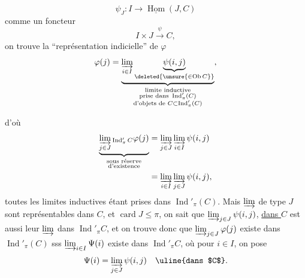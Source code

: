 \[
\psi_J:I\longrightarrow\underline{\operatorname{Hom}}(J,C)
\]
comme un foncteur
\[
I\times J\xrightarrow{\psi}C,
\]
on trouve la ``représentation indicielle'' de $\varphi$
\[
\varphi(j)=\underbrace{\varinjlim_{i\in I}\underbrace{\psi(i,j)}_{\deleted{\unsure{\in\operatorname{Ob}C}}}}_{\substack{\text{limite inductive}\\\text{prise dans }\operatorname{Ind}'_{\pi}(C)\\\text{d'objets de }C\subset\operatorname{Ind}'_{\pi}(C)}},
\]

d'où
\[
\begin{aligned}
\underbrace{\varinjlim_{j\in J}{}_{\operatorname{Ind}'_{\pi}C}\varphi(j)}_{\substack{\text{sous réserve}\\\text{d'existence}}}
&=\varinjlim_{j\in J}\varinjlim_{i\in I}\psi(i,j)\\
&=\varinjlim_{i\in I}\varinjlim_{j\in J}\psi(i,j),
\end{aligned}
\]
toutes les limites inductives étant prises dans $\operatorname{Ind}'_{\pi}(C)$. Mais   $\varinjlim$ de type $J$ sont représentables dans $C$, et $\operatorname{card}J\leq\pi$, on sait que  $\varinjlim_{j\in J}\psi(i,j)$, \uline{dans $C$} est aussi leur $\varinjlim$ dans $\operatorname{Ind}'_{\pi}C$, et on trouve donc que $\varinjlim_{j\in J}\varphi(j)$ existe dans $\operatorname{Ind}'_{\pi}(C)$ sss $\varinjlim_{i\in I}\Psi(i)$ existe dans $\operatorname{Ind}'_{\pi}C$, où pour $i\in I$, on pose
\[
\Psi(i)=\varinjlim_{j\in J}\psi(i,j)\quad\text{\uline{dans $C$}}.
\]

